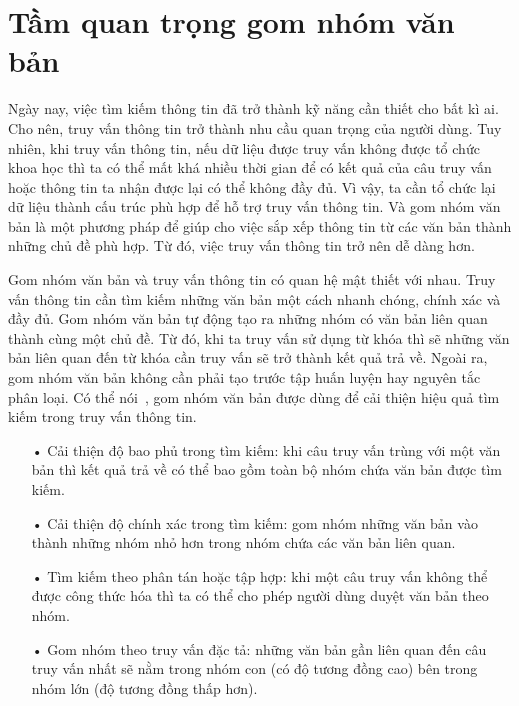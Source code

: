 \section{Tầm quan trọng gom nhóm văn bản}
Ngày nay, việc tìm kiếm thông tin đã trở thành kỹ năng cần thiết cho bất kì ai.
Cho nên, truy vấn thông tin trở thành nhu cầu quan trọng của người dùng.
Tuy nhiên, khi truy vấn thông tin, nếu dữ liệu được truy vấn không được tổ chức khoa học thì ta có thể mất khá nhiều thời gian để có kết quả của câu truy vấn hoặc thông tin ta nhận được lại có thể không đầy đủ.
Vì vậy, ta cần tổ chức lại dữ liệu thành cấu trúc phù hợp để hỗ trợ truy vấn thông tin.
Và gom nhóm văn bản là một phương pháp để giúp cho việc sắp xếp thông tin từ các văn bản thành những chủ đề phù hợp.
Từ đó, việc truy vấn thông tin trở nên dễ dàng hơn.

Gom nhóm văn bản và truy vấn thông tin có quan hệ mật thiết với nhau.
Truy vấn thông tin cần tìm kiếm những văn bản một cách nhanh chóng, chính xác và đầy đủ.
Gom nhóm văn bản tự động tạo ra những nhóm có văn bản liên quan thành cùng một chủ đề.
Từ đó, khi ta truy vấn sử dụng từ khóa thì sẽ những văn bản liên quan đến từ khóa cần truy vấn sẽ trở thành kết quả trả về.
Ngoài ra, gom nhóm văn bản không cần phải tạo trước tập huấn luyện hay nguyên tắc phân loại.
Có thể nói~\cite{text-clustering}, gom nhóm văn bản được dùng để cải thiện hiệu quả tìm kiếm trong truy vấn thông tin.
\begin{enumerate}
\item[•]Cải thiện độ bao phủ trong tìm kiếm: khi câu truy vấn trùng với một văn bản thì kết quả trả về có thể bao gồm toàn bộ nhóm chứa văn bản được tìm kiếm.
\item[•]Cải thiện độ chính xác trong tìm kiếm: gom nhóm những văn bản vào thành những nhóm nhỏ hơn trong nhóm chứa các văn bản liên quan.
\item[•]Tìm kiếm theo phân tán hoặc tập hợp: khi một câu truy vấn không thể được công thức hóa thì ta có thể cho phép người dùng duyệt văn bản theo nhóm.
\item[•]Gom nhóm theo truy vấn đặc tả: những văn bản gần liên quan đến câu truy vấn nhất sẽ nằm trong nhóm con (có độ tương đồng cao) bên trong nhóm lớn (độ tương đồng thấp hơn).
\end{enumerate}

